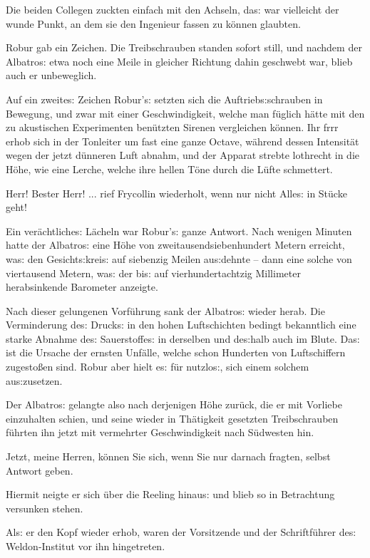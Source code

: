 \documentclass[oneside,12pt]{book}
\newcommand{\s}{s:}
\begin{document}
Die beiden Collegen zuckten einfach mit den Achseln, da{\s} war
vielleicht der wunde Punkt, an dem sie den Ingenieur fassen zu
k\"onnen glaubten.

Robur gab ein Zeichen. Die Treibschrauben standen sofort still, und
nachdem der {\glqq}Albatro{\s}{\grqq} etwa noch eine Meile in
gleicher Richtung dahin geschwebt war, blieb auch er unbeweglich.

Auf ein zweite{\s} Zeichen Robur'{\s} setzten sich die
Auftrieb{\s}schrauben in Bewegung, und zwar mit einer
Geschwindigkeit, welche man f\"uglich h\"atte mit den zu akustischen
Experimenten ben\"utzten Sirenen vergleichen k\"onnen. Ihr frrr erhob
sich in der Tonleiter um fast eine ganze Octave, w\"ahrend dessen
Intensit\"at wegen der jetzt d\"unneren Luft abnahm, und der Apparat
strebte lothrecht in die H\"ohe, wie eine Lerche, welche ihre hellen
T\"one durch die L\"ufte schmettert.

{\glqq}Herr! Bester Herr! ... rief Frycollin wiederholt, wenn nur
nicht Alle{\s} in St\"ucke geht!{\grqq}

Ein ver\"achtliche{\s} L\"acheln war Robur'{\s} ganze Antwort. Nach
wenigen Minuten hatte der {\glqq}Albatro{\s}{\grqq} eine H\"ohe von
zweitausendsiebenhundert Metern erreicht, wa{\s} den Gesicht{\s}krei{\s}
auf siebenzig Meilen au{\s}dehnte -- dann eine solche von viertausend
Metern, wa{\s} der bi{\s} auf vierhundertacht\/zig Millimeter
herabsinkende Barometer anzeigte.

Nach dieser gelungenen Vorf\"uhrung sank der {\glqq}Albatro{\s}{\grqq}
wieder herab. Die Verminderung de{\s} Druck{\s} in den hohen
Luftschichten bedingt bekanntlich eine starke Abnahme de{\s}
Sauerstoffe{\s} in derselben und de{\s}halb auch im Blute. Da{\s} ist
die Ursache der ernsten Unf\"alle, welche schon Hunderten von
Luftschiffern zugesto{\ss}en sind. Robur aber hielt e{\s} f\"ur
nutzlo{\s}, sich einem solchem au{\s}zusetzen.

Der {\glqq}Albatro{\s}{\grqq} gelangte also nach derjenigen H\"ohe
zur\"uck, die er mit Vorliebe einzuhalten schien, und seine wieder in
Th\"atigkeit gesetzten Treibschrauben f\"uhrten ihn jetzt mit
vermehrter Geschwindigkeit nach S\"udwesten hin.

{\glqq}Jetzt, meine Herren, k\"onnen Sie sich, wenn Sie nur darnach
fragten, selbst Antwort geben.{\grqq}

Hiermit neigte er sich \"uber die Reeling hinau{\s} und blieb so in
Betrachtung versunken stehen.

Al{\s} er den Kopf wieder erhob, waren der Vorsitzende und der
Schriftf\"uhrer de{\s} Weldon-Institut vor ihn hingetreten.
\end{document}
